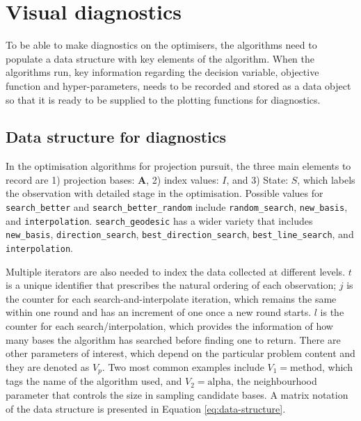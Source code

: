 \documentclass[12pt]{article}
\begin{document}
\hypertarget{vis-diag}{%
\section{Visual diagnostics}\label{vis-diag}}

To be able to make diagnostics on the optimisers, the algorithms need to populate a data structure with key elements of the algorithm. When the algorithms run, key information regarding the decision variable, objective function and hyper-parameters, needs to be recorded and stored as a data object so that it is ready to be supplied to the plotting functions for diagnostics.

\hypertarget{data-structure-for-diagnostics}{%
\subsection{Data structure for diagnostics}\label{data-structure-for-diagnostics}}

In the optimisation algorithms for projection pursuit, the three main elements to record are 1) projection bases: \(\mathbf{A}\), 2) index values: \(I\), and 3) State: \(S\), which labels the observation with detailed stage in the optimisation. Possible values for \texttt{search\_better} and \texttt{search\_better\_random} include \texttt{random\_search}, \texttt{new\_basis}, and \texttt{interpolation}. \texttt{search\_geodesic} has a wider variety that includes \texttt{new\_basis}, \texttt{direction\_search}, \texttt{best\_direction\_search}, \texttt{best\_line\_search}, and \texttt{interpolation}.

Multiple iterators are also needed to index the data collected at different levels. \(t\) is a unique identifier that prescribes the natural ordering of each observation; \(j\) is the counter for each search-and-interpolate iteration, which remains the same within one round and has an increment of one once a new round starts. \(l\) is the counter for each search/interpolation, which provides the information of how many bases the algorithm has searched before finding one to return. There are other parameters of interest, which depend on the particular problem content and they are denoted as \emph{\(V_{p}\)}. Two most common examples include \(V_1 = \text{method}\), which tags the name of the algorithm used, and \(V_2 = \text{alpha}\), the neighbourhood parameter that controls the size in sampling candidate bases. A matrix notation of the data structure is presented in Equation \ref{eq:data-structure}.
\end{document}
